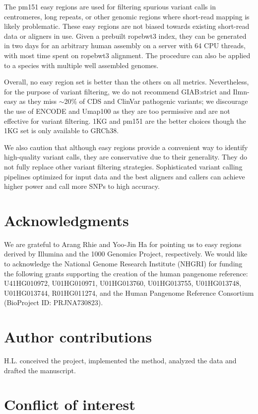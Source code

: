 \documentclass[webpdf,contemporary,large,namedate]{oup-authoring-template}%
\begin{document}
The pm151 easy regions are used for filtering spurious variant calls in centromeres, long repeats,
or other genomic regions where short-read mapping is likely problematic.
These easy regions are not biased towards existing short-read data or aligners in use.
Given a prebuilt ropebwt3 index, they can be generated in two days for an arbitrary human assembly on a server with 64 CPU threads, with most time spent on ropebwt3 alignment.
The procedure can also be applied to a species with multiple well assembled genomes.

Overall, no easy region set is better than the others on all metrics.
Nevertheless, for the purpose of variant filtering,
we do not recommend GIAB:strict and Ilmn-easy as they miss $\sim$20\% of CDS and ClinVar pathogenic variants;
we discourage the use of ENCODE and Umap100 as they are too permissive
and are not effective for variant filtering.
1KG and pm151 are the better choices
though the 1KG set is only available to GRCh38.

We also caution that although easy regions provide a convenient way to identify high-quality variant calls,
they are conservative due to their generality.
They do not fully replace other variant filtering strategies.
Sophisticated variant calling pipelines optimized for input data and the best aligners and callers can achieve higher power and call more SNPs to high accuracy.

\section*{Acknowledgments}

We are grateful to Arang Rhie and Yoo-Jin Ha for pointing us to easy regions
derived by Illumina and the 1000 Genomics Project, respectively.
We would like to acknowledge the National Genome Research Institute (NHGRI) for
funding the following grants supporting the creation of the human pangenome
reference: U41HG010972, U01HG010971, U01HG013760, U01HG013755, U01HG013748,
U01HG013744, R01HG011274, and the Human Pangenome Reference Consortium
(BioProject ID: PRJNA730823).

\section*{Author contributions}

H.L. conceived the project, implemented the method, analyzed the data and drafted the manuscript.

\section*{Conflict of interest}
\end{document}
